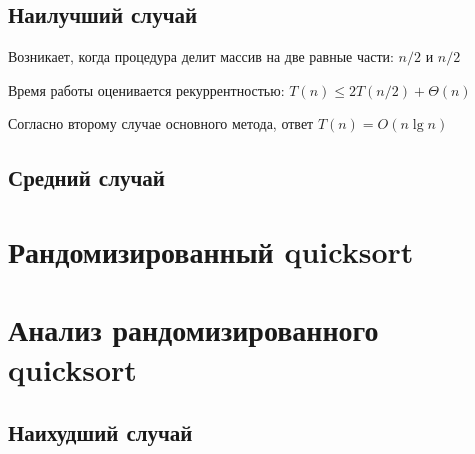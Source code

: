 \documentclass[11pt]{article}
\begin{document}
\subsection{Наилучший случай}

Возникает, когда процедура делит массив на две равные части: $n/2$ и $n/2$

Время работы оценивается рекуррентностью: $T(n) \leqslant 2T(n/2) + \Theta(n)$

Согласно второму случае основного метода, ответ $T(n) = O(n \lg n)$

\subsection{Средний случай}

\section{Рандомизированный quicksort}

\section{Анализ рандомизированного quicksort}

\subsection{Наихудший случай}
\end{document}

